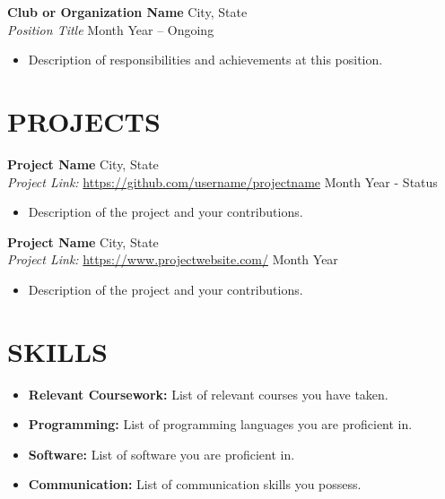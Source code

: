 \documentclass[a4paper,9pt]{extarticle}
\begin{document}
\noindent
\textbf{Club or Organization Name} \hfill City, State\\ %
\textit{Position Title} \hfill Month Year – Ongoing %
\begin{itemize}
    \item Description of responsibilities and achievements at this position. %
\end{itemize}

\section*{PROJECTS}
\noindent
\textbf{Project Name} \hfill City, State\\ %
\textit{Project Link:} \url{https://github.com/username/projectname} \hfill Month Year - Status %
\begin{itemize}
    \item Description of the project and your contributions. %
\end{itemize}

\noindent
\textbf{Project Name} \hfill City, State\\ %
\textit{Project Link:} \url{https://www.projectwebsite.com/} \hfill Month Year %
\begin{itemize}
    \item Description of the project and your contributions. %
\end{itemize}

\section*{SKILLS}
\begin{itemize}
    \item \textbf{Relevant Coursework:} List of relevant courses you have taken. %
    \item \textbf{Programming:} List of programming languages you are proficient in. %
    \item \textbf{Software:} List of software you are proficient in. %
    \item \textbf{Communication:} List of communication skills you possess. %
\end{itemize}

\end{document}

